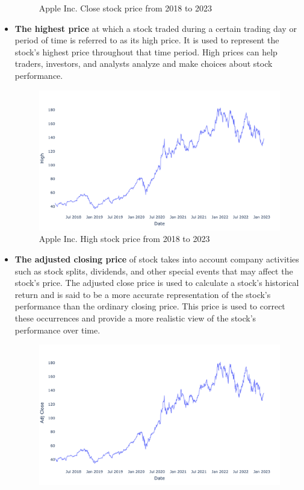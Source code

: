 \documentclass[a4paper]{article}
\begin{document}
\begin{itemize}[leftmargin=7.5pt]
\begin{figure}[!h]
    \caption{Apple Inc. Close stock price from 2018 to 2023}
    \label{fig:close}
\end{figure}
    \item \textbf{The highest price} at which a stock traded during a certain trading day or period of time is referred to as its high price. It is used to represent the stock's highest price throughout that time period. High prices can help traders, investors, and analysts analyze and make choices about stock performance.
    \begin{figure}[!h]
    \centering
    \includegraphics[width=15cm]{high.png}
    \caption{Apple Inc. High stock price from 2018 to 2023}
    \label{fig:high}
\end{figure}
    \item \textbf{The adjusted closing price} of stock takes into account company activities such as stock splits, dividends, and other special events that may affect the stock's price. The adjusted close price is used to calculate a stock's historical return and is said to be a more accurate representation of the stock's performance than the ordinary closing price. This price is used to correct these occurrences and provide a more realistic view of the stock's performance over time.
\begin{figure}[!h]
    \centering
    \includegraphics[width=15cm]{adjclose.png}

\end{figure}
\end{itemize}
\end{document}

